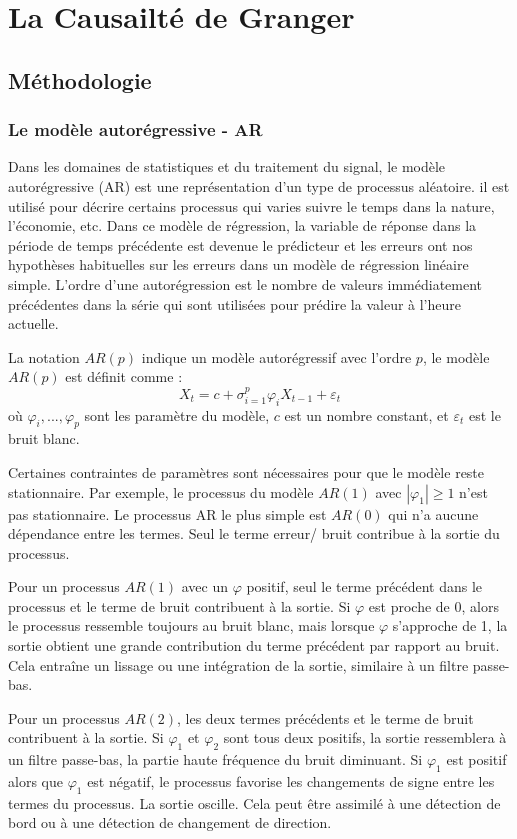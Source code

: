 \chapter{La \mt Causailté de Granger}
\label{chap5}

\section{Méthodologie}
\subsection{Le modèle  autorégressive - AR}
Dans les domaines de statistiques et du traitement du signal, le modèle autorégressive (AR) est une représentation d'un type de processus aléatoire. il est utilisé pour décrire certains processus  qui varies suivre le temps dans la nature, l'économie, etc. Dans ce modèle de régression, la variable de réponse dans la période de temps précédente est devenue le prédicteur et les erreurs ont nos hypothèses habituelles sur les erreurs dans un modèle de régression linéaire simple. L'ordre d'une autorégression est le nombre de valeurs immédiatement précédentes dans la série qui sont utilisées pour prédire la valeur à l'heure actuelle. 

La notation $AR(p)$ indique un modèle autorégressif avec l'ordre $p$, le modèle $AR(p)$ est définit comme : 
$$X_t = c + \sigma_{i = 1}^{p} \varphi_i  X_{t-1} + \varepsilon_t    $$
 où $\varphi_i, ..., \varphi_p$ sont les paramètre du  modèle, $c$ est un nombre constant, et $\varepsilon_t$ est le bruit blanc.
 
 Certaines contraintes de paramètres sont nécessaires pour que le modèle reste stationnaire. Par exemple, le processus du modèle $AR(1)$ avec $ | \varphi_1 | \geq 1 $ n'est pas stationnaire. Le processus AR le plus simple est $AR(0)$ qui n'a aucune dépendance entre les termes. Seul le terme erreur/ bruit contribue à la sortie du processus. 
 
 Pour un processus $AR(1)$ avec un $\varphi$ positif, seul le terme précédent dans le processus et le terme de bruit contribuent à la sortie. Si $\varphi$ est proche de 0, alors le processus ressemble toujours au bruit blanc, mais lorsque $\varphi$  s'approche de 1, la sortie obtient une grande contribution du terme précédent par rapport au bruit. Cela entraîne un lissage ou une intégration de la sortie, similaire à un filtre passe-bas. 
 
Pour un processus $AR(2)$, les deux termes précédents et le terme de bruit contribuent à la sortie. Si $\varphi_1$  et $\varphi_2$  sont tous deux positifs, la sortie ressemblera à un filtre passe-bas, la partie haute fréquence du bruit diminuant. Si $\varphi_1$ est positif alors que $\varphi_1$  est négatif, le processus favorise les changements de signe entre les termes du processus. La sortie oscille. Cela peut être assimilé à une détection de bord ou à une détection de changement de direction.

